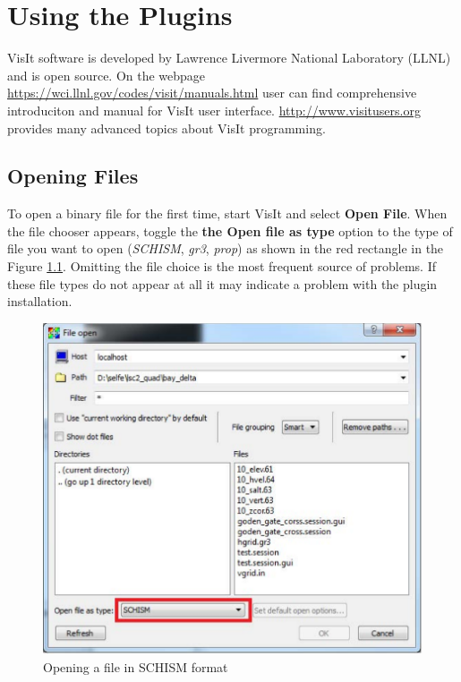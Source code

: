 \documentclass[12pt]{report}
\begin{document}
   
\chapter{Using the Plugins}
 
 VisIt software is developed by Lawrence Livermore National Laboratory (LLNL) and is open source. On the webpage  \url{https://wci.llnl.gov/codes/visit/manuals.html} user can find comprehensive introduciton and manual for VisIt user interface. \url{http://www.visitusers.org} provides many advanced topics about VisIt programming. 

\section{Opening Files}
To open a binary file for the first time, start VisIt and select {\bf Open \textrightarrow File}. 
When the file chooser appears, toggle the {\bf the Open file as type} option 
to the type of file you want to open (\emph{SCHISM}, \emph{gr3}, \emph{prop})
as shown in the red rectangle in the Figure \ref{figure:openFile}. 
Omitting the file choice is the most frequent source of problems. If these file types do 
not appear at all it may indicate a problem with the plugin installation.
 
\begin{figure}
\begin{center}
\includegraphics{visitOpenFile}
\caption{Opening a file in SCHISM format}
\label{figure:openFile}
\end{center}
\end{figure}
\end{document}
